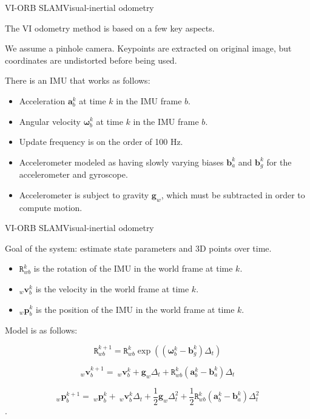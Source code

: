 \documentclass[aspectratio=169]{beamer}
\renewcommand{\vec}[1]{\boldsymbol{#1}}
\newcommand{\mat}[1]{\mathtt{#1}}
\begin{document}
\begin{frame}{VI-ORB SLAM}{Visual-inertial odometry}

The VI odometry method is based on a few key aspects.

\medskip

We assume a \alert{pinhole camera}.
Keypoints are extracted on original image, but
coordinates are undistorted before being used.

\medskip

There is an IMU that works as follows:
\begin{itemize}
\item Acceleration $\vec{a}_b^k$ at time $k$ in the IMU frame $b$.
\item Angular velocity $\vec{\omega}_b^k$ at time $k$ in the IMU frame $b$.
\item Update frequency is on the order of 100 Hz.
\item Accelerometer modeled as having slowly varying biases
      $\vec{b}_a^k$ and $\vec{b}_g^k$
      for the accelerometer and gyroscope.
\item Accelerometer is subject to gravity $\vec{g}_w$,
      which must be subtracted in order to compute motion.
\end{itemize}

\end{frame}


\begin{frame}{VI-ORB SLAM}{Visual-inertial odometry}

Goal of the system: estimate state parameters and 3D points over time.
\begin{itemize}
\item $\mat{R}_{wb}^k$ is the
   rotation of the IMU in the world frame at time $k$.
\item $_w\vec{v}_b^{k}$
   is the velocity in the world frame at time $k$.
\item $_w\vec{p}_b^{k}$ is
   the position of the IMU in the world frame at time $k$.
\end{itemize}

\medskip

Model is as follows:

   $$\mat{R}_{wb}^{k+1} = \mat{R}_{wb}^k \exp\left((\vec{\omega}_b^k-\vec{b}_g^k)\Delta_t\right)$$

  $$_w\vec{v}_b^{k+1} =\ _w\vec{v}_b^k + \vec{g}_w \Delta_t + \mat{R}_{wb}^k(\vec{a}^k_b-\vec{b}^k_a)\Delta_t$$

  $$_w\vec{p}_b^{k+1} =\ _w\vec{p}_b^k +\ _w\vec{v}_b^k\Delta_t + \frac{1}{2}\vec{g}_w\Delta_t^2 + \frac{1}{2}\mat{R}^k_{wb}(\vec{a}_b^k-\vec{b}^k_a)\Delta_t^2$$.

\end{frame}
\end{document}
